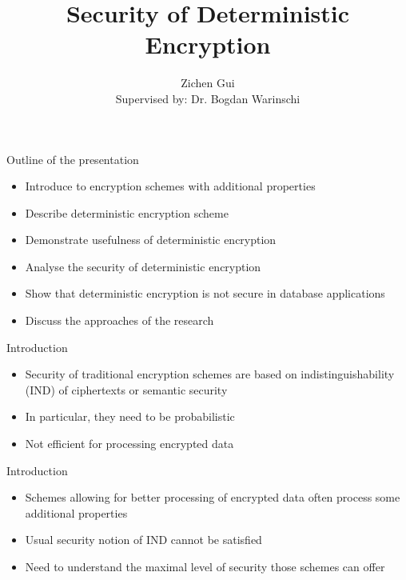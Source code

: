 \documentclass{beamer}
\title{Security of Deterministic Encryption}
\author[Zichen]{Zichen Gui\\{\small Supervised by: Dr. Bogdan Warinschi}}
\begin{document}
\frame{\titlepage}

\begin{frame}{Outline of the presentation}
\begin{itemize}
\item Introduce to encryption schemes with additional properties
\item Describe deterministic encryption scheme
\item Demonstrate usefulness of deterministic encryption
\item Analyse the security of deterministic encryption
\item Show that deterministic encryption is not secure in database applications
\item Discuss the approaches of the research
\end{itemize}
\end{frame}	


\begin{frame}{Introduction}
\begin{itemize}
\item Security of traditional encryption schemes are based on indistinguishability (IND) of ciphertexts or semantic security
\item In particular, they need to be probabilistic
\item Not efficient for processing encrypted data
\end{itemize}
\end{frame}


\begin{frame}{Introduction}
\begin{itemize}
\item Schemes allowing for better processing of encrypted data often process some additional properties
\item Usual security notion of IND cannot be satisfied
\item Need to understand the maximal level of security those schemes can offer
\end{itemize}
\end{frame}
\end{document}
